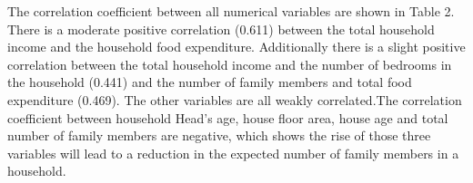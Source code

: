 \documentclass[
]{article}
\begin{document}
\begin{table}

\caption{\label{tab:numerical summaries}Summary statistics of numerical variables}
\centering
{}
\end{table}

The correlation coefficient between all numerical variables are shown in
Table 2. There is a moderate positive correlation (0.611) between the
total household income and the household food expenditure. Additionally
there is a slight positive correlation between the total household
income and the number of bedrooms in the household (0.441) and the
number of family members and total food expenditure (0.469). The other
variables are all weakly correlated.The correlation coefficient between
household Head's age, house floor area, house age and total number of
family members are negative, which shows the rise of those three
variables will lead to a reduction in the expected number of family
members in a household.
\end{document}
